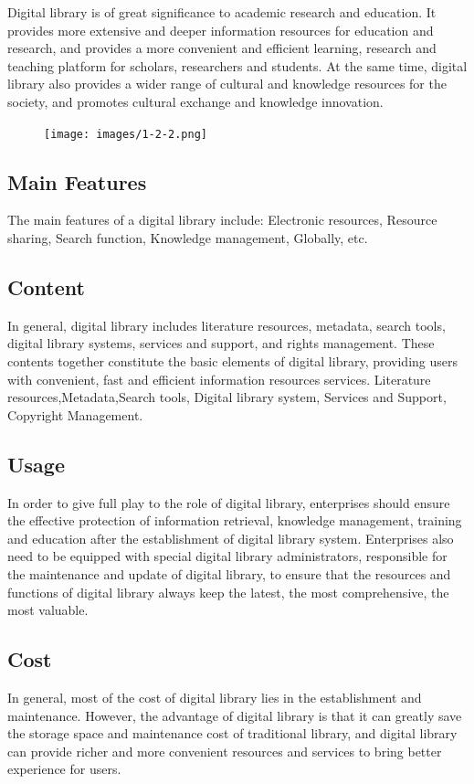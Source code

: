Digital library is of great significance to academic research and education. It provides more extensive and deeper information resources for education and research, and provides a more convenient and efficient learning, research and teaching platform for scholars, researchers and students. At the same time, digital library also provides a wider range of cultural and knowledge resources for the society, and promotes cultural exchange and knowledge innovation.

\begin{figure}[htbp]
  \centerline{\texttt{[image: images/1-2-2.png]}}
\end{figure}

\subsection{Main Features}
The main features of a digital library include:
Electronic resources, Resource sharing, Search function, Knowledge management, Globally, etc.

\subsection{Content}
In general, digital library includes literature resources, metadata, search tools, digital library systems, services and support, and rights management. These contents together constitute the basic elements of digital library, providing users with convenient, fast and efficient information resources services.
Literature resources,Metadata,Search tools, Digital library system, Services and Support, Copyright Management.

\subsection{Usage}
In order to give full play to the role of digital library, enterprises should ensure the effective protection of information retrieval, knowledge management, training and education after the establishment of digital library system. Enterprises also need to be equipped with special digital library administrators, responsible for the maintenance and update of digital library, to ensure that the resources and functions of digital library always keep the latest, the most comprehensive, the most valuable.

\subsection{Cost}
In general, most of the cost of digital library lies in the establishment and maintenance. However, the advantage of digital library is that it can greatly save the storage space and maintenance cost of traditional library, and digital library can provide richer and more convenient resources and services to bring better experience for users.
 
